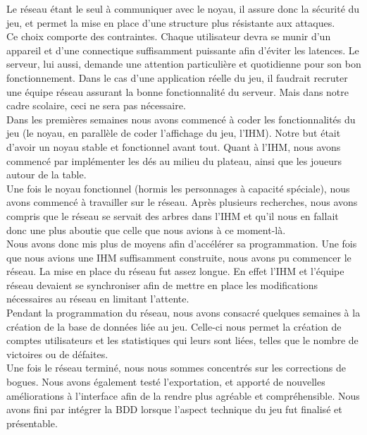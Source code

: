 \documentclass[a4paper,11pt]{article}
\begin{document}
\newpage

Le réseau étant le seul à communiquer avec le noyau, il assure donc la sécurité du jeu, et permet la mise en place d’une structure plus résistante aux attaques. \\

Ce choix comporte des contraintes. Chaque utilisateur devra se munir d’un appareil et d’une connectique suffisamment puissante afin d’éviter les latences. Le serveur, lui aussi, demande une attention particulière et quotidienne pour son bon fonctionnement. Dans le cas d’une application réelle du jeu, il faudrait recruter une équipe réseau assurant la bonne fonctionnalité du serveur. Mais dans notre cadre scolaire, ceci ne sera pas nécessaire.  \\

Dans les premières semaines nous avons commencé à coder les fonctionnalités du jeu (le noyau, en parallèle de coder l’affichage du jeu, l’IHM). Notre but était d’avoir un noyau stable et fonctionnel avant tout. Quant à l’IHM, nous avons commencé par implémenter les dés au milieu du plateau, ainsi que les joueurs autour de la table. \\

	Une fois le noyau fonctionnel (hormis les personnages à capacité spéciale), nous avons commencé à travailler sur le réseau. Après plusieurs recherches, nous avons compris que le réseau se servait des arbres dans l’IHM et qu’il nous en fallait donc une plus aboutie que celle que nous avions à ce moment-là. \\

Nous avons donc mis plus de moyens afin d’accélérer sa programmation. Une fois que nous avions une IHM suffisamment construite, nous avons pu commencer le réseau. La mise en place du réseau fut assez longue. En effet l’IHM et l’équipe réseau devaient se synchroniser afin de mettre en place les modifications nécessaires au réseau en limitant l’attente. \\

Pendant la programmation du réseau, nous avons consacré quelques semaines à la création de la base de données liée au jeu. Celle-ci nous permet la création de comptes utilisateurs et les statistiques qui leurs sont liées, telles que le nombre de victoires ou de défaites. \\

	Une fois le réseau terminé, nous nous sommes concentrés sur les corrections de bogues. Nous avons également testé l’exportation, et apporté de nouvelles améliorations  à l’interface afin de la rendre plus agréable et compréhensible. Nous avons fini par intégrer la BDD lorsque l’aspect technique du jeu fut finalisé et présentable. \\ 
\end{document}
